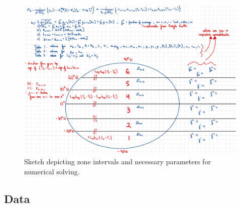\documentclass[12pt]{article}
\begin{document}
\begin{figure}[H]
    \centering
    \includegraphics[scale=0.5]{Graphicalg.pdf}
    \caption{
        Sketch depicting zone intervals and necessary parameters for numerical
        solving.
    }
    \label{fig:graphicalg}
\end{figure}
\FloatBarrier

\subsection{Data}
\end{document}
